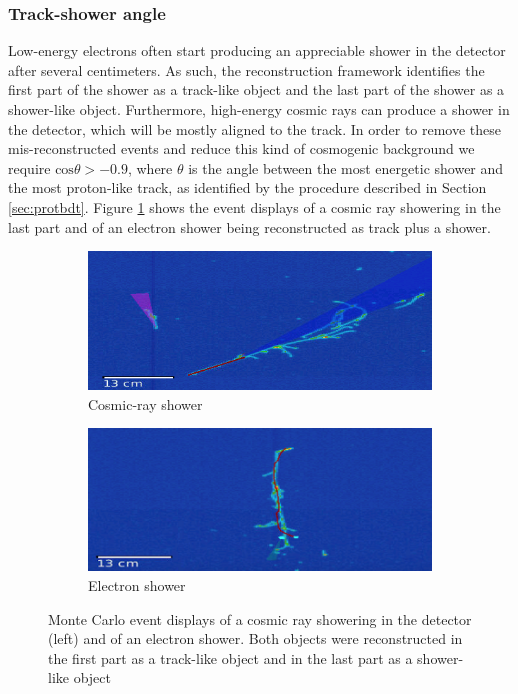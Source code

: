 \subsubsection{Track-shower angle}
Low-energy electrons often start producing an appreciable shower in the detector after several centimeters. As such, the reconstruction framework identifies the first part of the shower as a track-like object and the last part of the shower as a shower-like object. 
Furthermore, high-energy cosmic rays can produce a shower in the detector, which will be mostly aligned to the track. In order to remove these mis-reconstructed events and reduce this kind of cosmogenic background we require $\mathrm{cos}\theta > -0.9$, where $\theta$ is the angle between the most energetic shower and the most proton-like track, as identified by the procedure described in Section \ref{sec:protbdt}.
Figure \ref{fig:angle} shows the event displays of a cosmic ray showering in the last part and of an electron shower being reconstructed as track plus a shower.

\begin{figure}[htbp]
\centering
  \begin{subfigure}{0.45\textwidth}
    \includegraphics[width=\linewidth]{figures/angle1.png}
    \caption{Cosmic-ray shower} 
  \end{subfigure}
    \begin{subfigure}{0.45\textwidth}
    \includegraphics[width=\linewidth]{figures/angle2.png}
    \caption{Electron shower} 
  \end{subfigure}
  \caption{Monte Carlo event displays of a cosmic ray showering in the detector (left) and of an electron shower. Both objects were reconstructed in the first part as a track-like object and in the last part as a shower-like object}\label{fig:angle}
\end{figure}


